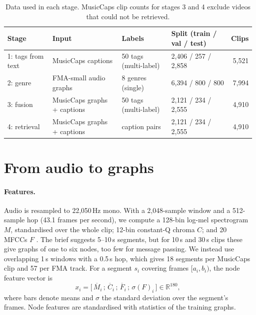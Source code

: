 \documentclass{article}
\newcommand{\R}{\mathbb{R}}
\begin{document}
\begin{table}[t]
  \caption{Data used in each stage. MusicCaps clip counts for stages 3 and 4 exclude videos that could not be
  retrieved.}
  \label{tab:data}
  \centering
  \small
  \begin{tabular}{llllr}
    \toprule
    Stage & Input & Labels & Split (train / val / test) & Clips \\
    \midrule
    1: tags from text  & MusicCaps captions          & 50 tags (multi-label) & 2,406 / 257 / 2,858 & 5,521 \\
    2: genre           & FMA-small audio graphs      & 8 genres (single)     & 6,394 / 800 / 800   & 7,994 \\
    3: fusion          & MusicCaps graphs + captions & 50 tags (multi-label) & 2,121 / 234 / 2,555 & 4,910 \\
    4: retrieval       & MusicCaps graphs + captions & caption pairs         & 2,121 / 234 / 2,555 & 4,910 \\
    \bottomrule
  \end{tabular}
\end{table}

\section{From audio to graphs}
\label{sec:graphs}

\paragraph{Features.}
Audio is resampled to 22,050\,Hz mono. With a 2,048-sample window and a 512-sample hop (43.1 frames per second), we
compute a 128-bin log-mel spectrogram $M$, standardised over the whole clip; 12-bin constant-Q chroma $C$; and 20 MFCCs
$F$ \citep{mcfee2015librosa}. The brief suggests 5--10\,s segments, but for 10\,s and 30\,s clips these give graphs of
one to six nodes, too few for message passing. We instead use overlapping 1\,s windows with a 0.5\,s hop, which gives
18 segments per MusicCaps clip and 57 per FMA track. For a segment $s_i$ covering frames $[a_i, b_i)$, the node feature
vector is
\begin{equation}
  x_i = \big[\,\overline{M}_{i} \,;\, \overline{C}_{i} \,;\, \overline{F}_{i} \,;\, \sigma(F)_{i}\,\big] \in \R^{180},
\end{equation}
where bars denote means and $\sigma$ the standard deviation over the segment's frames. Node features are standardised
with statistics of the training graphs.
\end{document}
